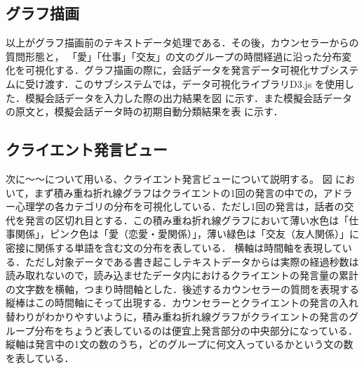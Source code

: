 \documentclass[shuuron]{kuee}
\begin{document}
\subsection{グラフ描画}
以上がグラフ描画前のテキストデータ処理である．その後，カウンセラーからの質問形態と， 「愛」「仕事」「交友」の文のグループの時間経過に沿った分布変化を可視化する．グラフ描画の際に，会話データを発言データ可視化サブシステムに受け渡す．このサブシステムでは，データ可視化ライブラリD3.js
を使用した．模擬会話データを入力した際の出力結果を図
に示す．また模擬会話データの原文と，模擬会話データ時の初期自動分類結果を表
に示す．
%

\subsection{クライエント発言ビュー}
次に〜〜について用いる、クライエント発言ビューについて説明する。
図
において，まず積み重ね折れ線グラフはクライエントの1回の発言の中での，アドラー心理学の各カテゴリの分布を可視化している．ただし1回の発言は，話者の交代を発言の区切れ目とする．この積み重ね折れ線グラフにおいて薄い水色は「仕事関係」，ピンク色は「愛（恋愛・愛関係）」，薄い緑色は「交友（友人関係）」に密接に関係する単語を含む文の分布を表している．
横軸は時間軸を表現している．ただし対象データである書き起こしテキストデータからは実際の経過秒数は読み取れないので，読み込ませたデータ内におけるクライエントの発言量の累計の文字数を横軸，つまり時間軸とした．後述するカウンセラーの質問を表現する縦棒はこの時間軸にそって出現する．カウンセラーとクライエントの発言の入れ替わりがわかりやすいように，積み重ね折れ線グラフがクライエントの発言のグループ分布をちょうど表しているのは便宜上発言部分の中央部分になっている．
縦軸は発言中の1文の数のうち，どのグループに何文入っているかという文の数を表している．
\end{document}
